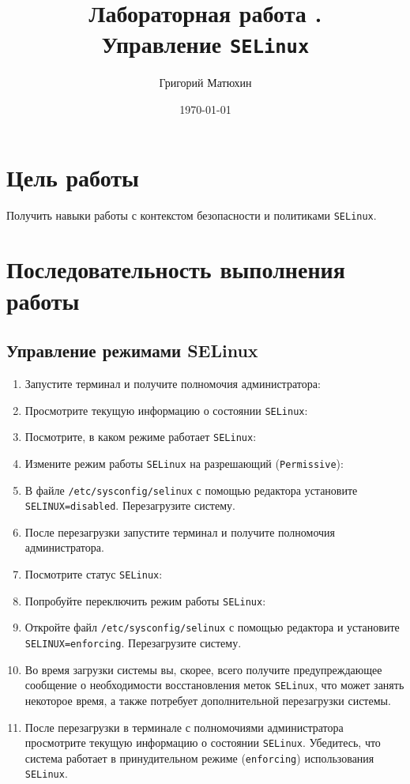 \documentclass[12pt]{article}
\author{Григорий Матюхин}
\date{\today}
\title{Лабораторная работа \textnumero9.\\Управление \texttt{SELinux}}
\begin{document}
\maketitle
\newpage
\tableofcontents
\newpage
\section{Цель работы}
Получить навыки работы с контекстом безопасности и политиками \texttt{SELinux}.

\section{Последовательность выполнения работы}
\subsection{Управление режимами SELinux}
\begin{enumerate}
	\item Запустите терминал и получите полномочия администратора:
	\item Просмотрите текущую информацию о состоянии \texttt{SELinux}:
	\item Посмотрите, в каком режиме работает \texttt{SELinux}:
	\item Измените режим работы \texttt{SELinux} на разрешающий (\texttt{Permissive}):
	\item В файле \texttt{/etc/sysconfig/selinux} с помощью редактора установите \texttt{SELINUX=disabled}. Перезагрузите систему.
	\item После перезагрузки запустите терминал и получите полномочия администратора.
	\item Посмотрите статус \texttt{SELinux}:
	\item Попробуйте переключить режим работы \texttt{SELinux}:
	\item Откройте файл \texttt{/etc/sysconfig/selinux} с помощью редактора и установите \texttt{SELINUX=enforcing}. Перезагрузите систему.
	\item Во время загрузки системы вы, скорее, всего получите предупреждающее сообщение о необходимости восстановления меток \texttt{SELinux}, что может занять некоторое время, а также потребует дополнительной перезагрузки системы.
	\item После перезагрузки в терминале с полномочиями администратора просмотрите текущую информацию о состоянии \texttt{SELinux}. Убедитесь, что система работает в принудительном режиме (\texttt{enforcing}) использования \texttt{SELinux}.
\end{enumerate}
\end{document}
